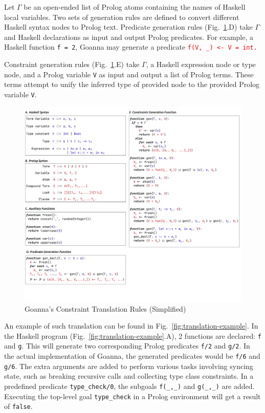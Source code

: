\documentclass[pdflatex,lineno,sn-nature,Numbered]{sn-jnl}%
\begin{document}
    Let $\Gamma$ be an open-ended list of Prolog atoms containing the names of Haskell local variables. Two sets of generation rules are defined to convert different Haskell syntax nodes to Prolog text. Predicate generation rules (Fig.~\ref{fig:translation}.D) take $\Gamma$ and Haskell declarations as input and output Prolog predicates. For example, a Haskell function \texttt{f = 2}, Goanna may generate a predicate \texttt{\textcolor{red}{f(V, \_) <- V = int.}}
    
    Constraint generation rules (Fig.~\ref{fig:translation}.E) take $\Gamma$, a Haskell expression node or type node, and a Prolog variable \texttt{V} as input and output a list of Prolog terms. These terms attempt to unify the inferred type of provided node to the provided Prolog variable \texttt{V}.
    
    \begin{figure}[ht!]
        \centering
        \includegraphics[width=\linewidth,trim={0 6cm 0 0},clip]{images/Generation}
        \caption{Goanna's Constraint Translation Rules (Simplified)} 
        \label{fig:translation}
    \end{figure}
    
  
    An example of such translation can be found in Fig.~\ref{fig:translation-example}. In the Haskell program (Fig.~\ref{fig:translation-example}.A), 2 functions are declared: \texttt{f} and \texttt{g}. This will generate two corresponding Prolog predicates \texttt{f/2} and \texttt{g/2}. In the actual implementation of Goanna, the generated predicates would be \texttt{f/6} and \texttt{g/6}. The extra arguments are added to perform various tasks involving syncing state, such as breaking recursive calls and collecting type class constraints. In a predefined predicate \texttt{type\_check/0}, the subgoals \texttt{f(\_,\_)} and \texttt{g(\_,\_)} are added. Executing the top-level goal \texttt{type\_check} in a Prolog environment will get a result of \texttt{false}.
    
\end{document}
